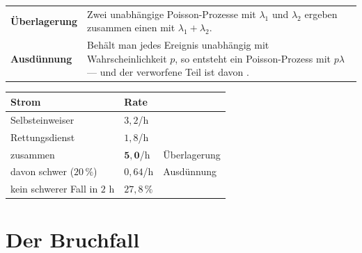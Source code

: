 \begin{merksatz}
\begin{center}
{\small
\renewcommand{\arraystretch}{1.55}
\begin{tabular}{@{}P{2.6cm}P{6.0cm}@{}}
\toprule
\textbf{Überlagerung} & Zwei unabhängige Poisson-Prozesse mit $\lambda_1$ und $\lambda_2$ ergeben zusammen einen mit $\lambda_1+\lambda_2$.\\
\textbf{Ausdünnung} & Behält man jedes Ereignis unabhängig mit Wahrscheinlichkeit $p$, so entsteht ein Poisson-Prozess mit $p\lambda$ --- und der verworfene Teil ist davon .\\
\bottomrule
\end{tabular}}
\end{center}

\begin{center}
{\small
\renewcommand{\arraystretch}{1.48}
\begin{tabular}{@{}P{3.2cm}P{2.4cm}P{2.4cm}@{}}
\toprule
\textbf{Strom} & \textbf{Rate} & \\
\midrule
Selbsteinweiser & $3{,}2$/h & \\
Rettungsdienst & $1{,}8$/h & \\
zusammen & $\mathbf{5{,}0}$/h & Überlagerung\\
\midrule
davon schwer ($20\,\%$) & $0{,}64$/h & Ausdünnung\\
kein schwerer Fall in $2$ h & $27{,}8\,\%$ & \\
\bottomrule
\end{tabular}}
\end{center}

\begin{center}
\begin{minipage}{0.88\textwidth}
\end{minipage}
\end{center}
\end{merksatz}

\section{Der Bruchfall}

